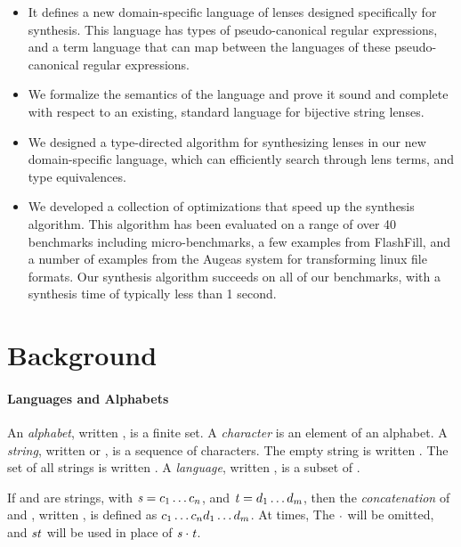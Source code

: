 \documentclass[numbers,10pt,preprint\ifanon ,nocopyrightspace\fi]{sigplanconf}
\begin{document}
\begin{itemize}
\item It defines a new domain-specific language of lenses designed specifically
  for synthesis.  This language has types of pseudo-canonical regular
  expressions, and a term language that can map between the languages of these
  pseudo-canonical regular expressions.
\item We formalize the semantics of the language and prove it sound and complete
  with respect to an existing, standard language for bijective string lenses.
\item We designed a type-directed algorithm for synthesizing lenses in our new
  domain-specific language, which can efficiently search through lens terms, and
  type equivalences.
\item We developed a collection of optimizations that speed up the
  synthesis algorithm.  This algorithm has been evaluated on a range of
  over 40 benchmarks including micro-benchmarks, a few examples from FlashFill,
  and a number of examples from the Augeas system for transforming linux
  file formats.  Our synthesis algorithm succeeds on all of our
  benchmarks, with a synthesis time of typically less than 1 second.
\end{itemize}

\section{Background}

\paragraph*{Languages and Alphabets}

An \textit{alphabet}, written \Alphabet{}, is a finite set.
A \textit{character} is an element of an alphabet.
A \textit{string}, written \String{} or \StringAlt{}, is a sequence of characters.
The empty string is written \EmptyString{}.
The set of all strings is written \StarOf{\Alphabet}.
A \textit{language}, written \Language{}, is a subset of \StarOf{\Alphabet}.

If \String{} and \StringAlt{} are strings, with
$\mathit{s}=c_1\ldots c_n$,
and $\mathit{t}=d_1\ldots d_m$,
then the \textit{concatenation} of \String{} and \StringAlt{},
written \String{}\Concat\StringAlt{}, is defined as
$c_1\ldots c_nd_1\ldots d_m$.
At times, The $\cdot$ will be omitted, and $\mathit{s}\mathit{t}$ will be used in
place of $\mathit{s}\cdot\mathit{t}$.
\end{document}
